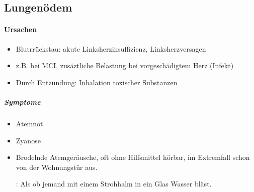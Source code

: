 \subsection{Lungenödem}\label{topic:lungenoedem}

\nopagebreak

\paragraph{Ursachen}

\begin{itemize}
    \item Blutrrückstau: akute Linksherzinsuffizienz,
    Linksherzversagen
    \item z.B. bei MCI, zusäztliche Belastung bei vorgeschädigtem Herz
    (Infekt)
    \item Durch Entzündung: Inhalation toxischer Substanzen
\end{itemize}

\subparagraph{Symptome}

\begin{itemize}
    \item Atemnot
    
    \item Zyanose
    
    \item {}Brodelnde Atemgeräusche, oft
    ohne Hilfsmittel hörbar, im Extremfall schon von der Wohnungstür
    aus.
    
    \begin{center}

: Als ob jemand mit einem
Strohhalm in ein Glas Wasser bläst.
\end{center}

\end{itemize}

